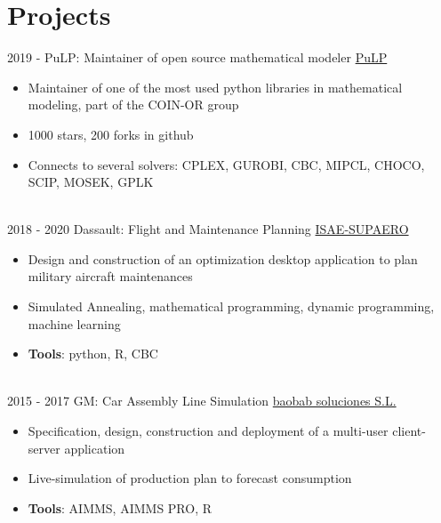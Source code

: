 \documentclass[letterpaper]{twentysecondcv} %
\begin{document}
\section{Projects}
\begin{twenty}
	\twentyitem
    	{2019 - }
		{}
        {PuLP: Maintainer of open source mathematical modeler}
        {\href{https://github.com/coin-or/pulp}{PuLP}}
        {}
        {
        {\begin{itemize}
        \item Maintainer of one of the most used python libraries in mathematical modeling, part of the COIN-OR group
        \item 1000 stars, 200 forks in github
        \item Connects to several solvers: CPLEX, GUROBI, CBC, MIPCL, CHOCO, SCIP, MOSEK, GPLK
        \vspace{2mm}
		\end{itemize}}
        }
  \\
  \twentyitem
      {2018 - 2020}
    {}
        {Dassault: Flight and Maintenance Planning}
        {\href{https://www.isae-supaero.fr/en/}{ISAE-SUPAERO}}
        {}
        {
        {\begin{itemize}
        \item Design and construction of an optimization desktop application to plan military aircraft maintenances
        \item Simulated Annealing, mathematical programming, dynamic programming, machine learning
        \item \textbf{Tools}: python, R, CBC
        \vspace{2mm}
    \end{itemize}}
        }
  \\
  \twentyitem
      {2015 - 2017}
    {}
        {GM: Car Assembly Line Simulation}
        {\href{https://baobabsoluciones.es/en/}{baobab soluciones S.L.}}
        {}
        {
        {\begin{itemize}
        \item Specification, design, construction and deployment of a multi-user client-server application
        \item Live-simulation of production plan to forecast consumption
        \item \textbf{Tools}: AIMMS, AIMMS PRO, R
        \vspace{2mm}
    \end{itemize}}
        }
  \\
  \twentyitem

\end{twenty}
\end{document}
